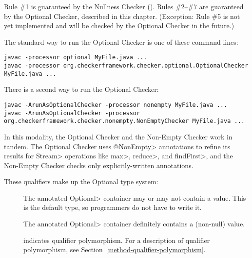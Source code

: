 Rule \#1 is guaranteed by the Nullness Checker
().
Rules \#2--\#7 are guaranteed by the Optional Checker, described in this chapter.
(Exception:  Rule \#5 is not yet implemented and will be checked by the
Optional Checker in the future.)



The standard way to run the Optional Checker is one of these command lines:

\begin{Verbatim}
javac -processor optional MyFile.java ...
javac -processor org.checkerframework.checker.optional.OptionalChecker MyFile.java ...
\end{Verbatim}

There is a second way to run the Optional Checker:

\begin{Verbatim}
javac -ArunAsOptionalChecker -processor nonempty MyFile.java ...
javac -ArunAsOptionalChecker -processor org.checkerframework.checker.nonempty.NonEmptyChecker MyFile.java ...
\end{Verbatim}

In this modality, the Optional Checker and the Non-Empty Checker work in
tandem.  The Optional Checker uses \<@NonEmpty> annotations to refine its
results for \<Stream> operations like \<max>, \<reduce>, and \<findFirst>,
and the Non-Empty Checker checks only explicitly-written annotations.



These qualifiers make up the Optional type system:

\begin{description}

\item[]
  The annotated \<Optional> container may or may not contain a value.
  This is the default type, so programmers do not have to write it.

\item[]
  The annotated \<Optional> container definitely contains a (non-null) value.

\item[]
  indicates qualifier polymorphism.
  For a description of qualifier polymorphism, see
  Section~\ref{method-qualifier-polymorphism}.

\end{description}

